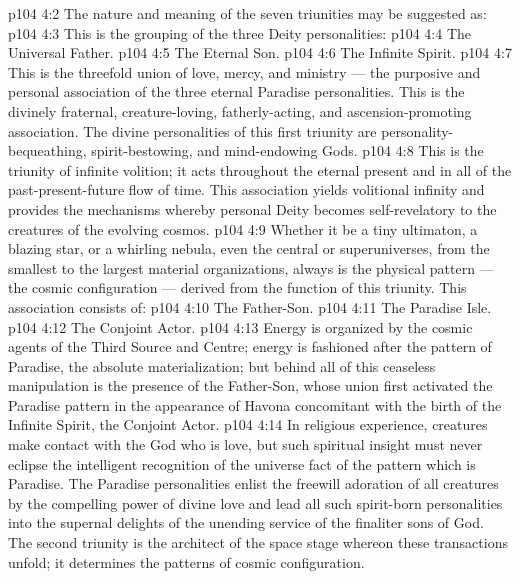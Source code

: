 \vs p104 4:2 \pc The nature and meaning of the seven triunities may be suggested as:
\vs p104 4:3 \pc {} This is the grouping of the three Deity personalities:
\vs p104 4:4 \bibnobreakspace The Universal Father.
\vs p104 4:5 \bibnobreakspace The Eternal Son.
\vs p104 4:6 \bibnobreakspace The Infinite Spirit.
\vs p104 4:7 \pc This is the threefold union of love, mercy, and ministry --- the purposive and personal association of the three eternal Paradise personalities. This is the divinely fraternal, creature\hyp{}loving, fatherly\hyp{}acting, and ascension\hyp{}promoting association. The divine personalities of this first triunity are personality\hyp{}bequeathing, spirit\hyp{}bestowing, and mind\hyp{}endowing Gods.
\vs p104 4:8 This is the triunity of infinite volition; it acts throughout the eternal present and in all of the past\hyp{}present\hyp{}future flow of time. This association yields volitional infinity and provides the mechanisms whereby personal Deity becomes self\hyp{}revelatory to the creatures of the evolving cosmos.
\vs p104 4:9 \pc {} Whether it be a tiny ultimaton, a blazing star, or a whirling nebula, even the central or superuniverses, from the smallest to the largest material organizations, always is the physical pattern --- the cosmic configuration --- derived from the function of this triunity. This association consists of:
\vs p104 4:10 \bibnobreakspace The Father\hyp{}Son.
\vs p104 4:11 \bibnobreakspace The Paradise Isle.
\vs p104 4:12 \bibnobreakspace The Conjoint Actor.
\vs p104 4:13 \pc Energy is organized by the cosmic agents of the Third Source and Centre; energy is fashioned after the pattern of Paradise, the absolute materialization; but behind all of this ceaseless manipulation is the presence of the Father\hyp{}Son, whose union first activated the Paradise pattern in the appearance of Havona concomitant with the birth of the Infinite Spirit, the Conjoint Actor.
\vs p104 4:14 In religious experience, creatures make contact with the God who is love, but such spiritual insight must never eclipse the intelligent recognition of the universe fact of the pattern which is Paradise. The Paradise personalities enlist the freewill adoration of all creatures by the compelling power of divine love and lead all such spirit\hyp{}born personalities into the supernal delights of the unending service of the finaliter sons of God. The second triunity is the architect of the space stage whereon these transactions unfold; it determines the patterns of cosmic configuration.
